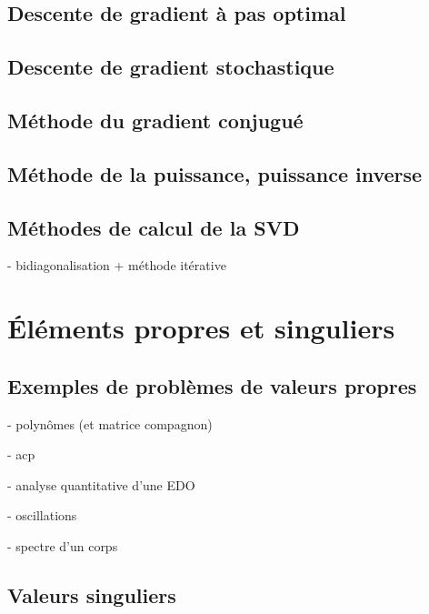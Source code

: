 \subsection{Descente de gradient à pas optimal}

\subsection{Descente de gradient stochastique}

\subsection{Méthode du gradient conjugué}

\subsection{Méthode de la puissance, puissance inverse}

\subsection{Méthodes de calcul de la SVD}

- bidiagonalisation + méthode itérative




\section{Éléments propres et singuliers}

\subsection{Exemples de problèmes de valeurs propres}

- polynômes (et matrice compagnon)

- acp

- analyse quantitative d'une EDO

- oscillations

- spectre d'un corps

\subsection{Valeurs singuliers}

